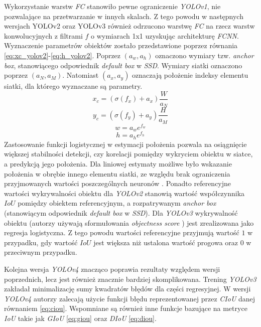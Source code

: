Wykorzystanie warstw \emph{FC} stanowiło pewne ograniczenie \emph{YOLOv1}, nie pozwalające na przetwarzanie w innych skalach.
Z tego powodu w następnych wersjach YOLOv2 \cite{yolov2} oraz YOLOv3 \cite{yolov3} również odrzucono warstwę \emph{FC} na rzecz warstw konwolucyjnych z filtrami $f$ o wymiarach 1x1 uzyskując architekturę \emph{FCNN}. 
Wyznaczenie parametrów obiektów zostało przedstawione poprzez równania \eqref{eq:xc_yolov2}-\eqref{eq:h_yolov2}. Poprzez $(a_w,a_h)$ oznaczono wymiary tzw. \emph{anchor box}, stanowiącego odpowiednik \emph{default box} w \emph{SSD}. 
Wymiary siatki oznaczono poprzez $(a_N,a_M)$. Natomiast $(a_x,a_y)$ oznaczają położenie indeksy elementu siatki, dla którego wyznaczane są parametry. 
\begin{equation}
x_c = (\sigma(f_x) + a_x) \frac{W}{a_N}
\label{eq:xc_yolov2}
\end{equation}
\begin{equation}
y_c = (\sigma(f_y) + a_y) \frac{H}{a_M}
\label{eq:yc_yolov2}
\end{equation}
\begin{equation}
w = a_w e^{f_w}
\label{eq:w_yolov2}
\end{equation}
\begin{equation}
h = a_h e^{f_h}
\label{eq:h_yolov2}
\end{equation}
Zastosowanie funkcji logistycznej w estymacji położenia pozwala na osiągnięcie większej stabilności detekcji, czy korelacji pomiędzy wykryciem obiektu w siatce, a predykcją jego położenia.
Dla liniowej estymaty możliwe było wskazanie położenia w obrębie innego elementu siatki, ze względu brak ograniczenia przyjmowanych wartości poszczególnych neuronów \cite{yolov2}. 
Ponadto referencyjne wartości wykrywalności obiektu dla \emph{YOLOv2} stanowią wartość współczynnika $IoU$ pomiędzy obiektem referencyjnym, a rozpatrywanym \emph{anchor box} (stanowiącym odpowiednik \emph{default box} w \emph{SSD}). 
Dla \emph{YOLOv3} wykrywalność obiektu (autorzy używają sformułowania \emph{objectness score} \cite{yolov3}) jest zrealizowana jako regresja logistyczna. 
Z tego powodu wartości referencyjne przyjmują wartość $1$ w przypadku, gdy wartość $IoU$ jest większa niż ustalona wartość progowa oraz $0$ w przeciwnym przypadku. 

Kolejna wersja \emph{YOLOv4}\cite{yolov4} znacząco poprawia rezultaty względem wersji poprzednich, lecz jest również znacznie bardziej skomplikowana. Trening \emph{YOLOv3} zakładał minimalizację sumy kwadratów błędów dla części regresyjnej. W wersji \emph{YOLOv4} autorzy\cite{yolov4} zalecają użycie funkcji błędu reprezentowanej przez \emph{CIoU} \cite{dciou} danej równaniem \eqref{eq:ciou}.
Wspomniane są również inne funkcje bazujące na metryce \emph{IoU} takie jak \emph{GIoU}\cite{giou} \eqref{eq:giou} oraz \emph{DIoU} \cite{dciou} \eqref{eq:diou}.

